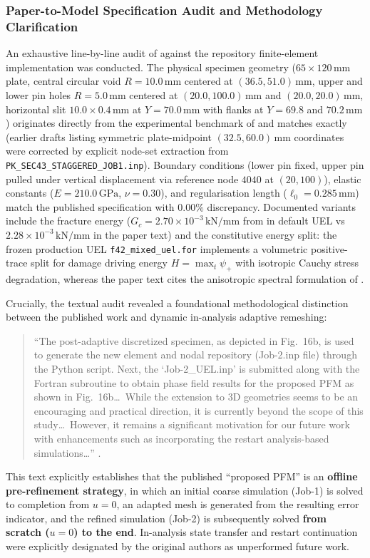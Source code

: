 \subsubsection{Paper-to-Model Specification Audit and Methodology Clarification}
An exhaustive line-by-line audit of \citet{pandey2025} against the repository finite-element implementation was conducted. The physical specimen geometry ($65 \times 120\,\mathrm{mm}$ plate, central circular void $R = 10.0\,\mathrm{mm}$ centered at $(36.5, 51.0)\,\mathrm{mm}$, upper and lower pin holes $R = 5.0\,\mathrm{mm}$ centered at $(20.0, 100.0)\,\mathrm{mm}$ and $(20.0, 20.0)\,\mathrm{mm}$, horizontal slit $10.0 \times 0.4\,\mathrm{mm}$ at $Y = 70.0\,\mathrm{mm}$ with flanks at $Y = 69.8$ and $70.2\,\mathrm{mm}$) originates directly from the experimental benchmark of \citet{ambati2015} and matches \citet[Figure~14]{pandey2025} exactly (earlier drafts listing symmetric plate-midpoint $(32.5, 60.0)\,\mathrm{mm}$ coordinates were corrected by explicit node-set extraction from \texttt{PK\_SEC43\_STAGGERED\_JOB1.inp}). Boundary conditions (lower pin fixed, upper pin pulled under vertical displacement via reference node $4040$ at $(20, 100)$), elastic constants ($E = 210.0\,\mathrm{GPa}$, $\nu = 0.30$), and regularisation length ($\ell_0 = 0.285\,\mathrm{mm}$) match the published specification with $0.00\%$ discrepancy. Documented variants include the fracture energy ($G_c = 2.70 \times 10^{-3}\,\mathrm{kN/mm}$ from \citet{ambati2015} in default UEL vs $2.28 \times 10^{-3}\,\mathrm{kN/mm}$ in the paper text) and the constitutive energy split: the frozen production UEL \texttt{f42\_mixed\_uel.for} implements a volumetric positive-trace split for damage driving energy $H = \max_t \psi_+$ with isotropic Cauchy stress degradation, whereas the paper text cites the anisotropic spectral formulation of \citet{miehe2010b}.

Crucially, the textual audit revealed a foundational methodological distinction between the published work and dynamic in-analysis adaptive remeshing:
\begin{quote}
``The post-adaptive discretized specimen, as depicted in Fig.~16b, is used to generate the new element and nodal repository (Job-2.inp file) through the Python script. Next, the `Job-2\_UEL.inp' is submitted along with the Fortran subroutine to obtain phase field results for the proposed PFM as shown in Fig.~16b\dots\ While the extension to 3D geometries seems to be an encouraging and practical direction, it is currently beyond the scope of this study\dots\ However, it remains a significant motivation for our future work with enhancements such as incorporating the restart analysis-based simulations\dots'' \citep[Section~4.3 and Conclusions]{pandey2025}.
\end{quote}
This text explicitly establishes that the published ``proposed PFM'' is an \textbf{offline pre-refinement strategy}, in which an initial coarse simulation (Job-1) is solved to completion from $u = 0$, an adapted mesh is generated from the resulting error indicator, and the refined simulation (Job-2) is subsequently solved \textbf{from scratch ($u = 0$) to the end}. In-analysis state transfer and restart continuation were explicitly designated by the original authors as unperformed future work.

